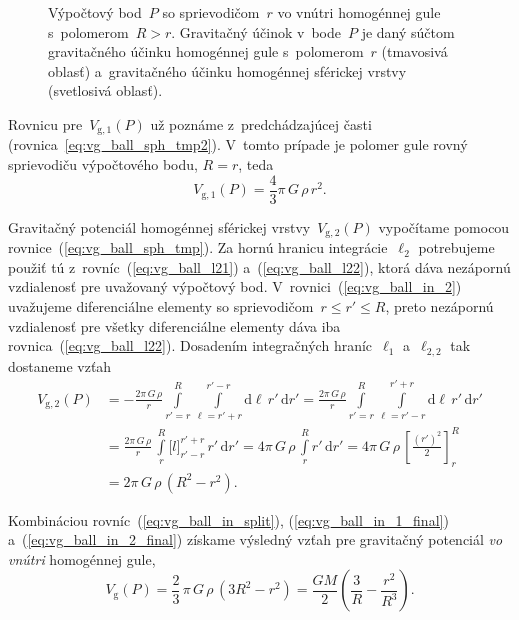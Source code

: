 \documentclass[a4paper, 12pt]{book}
\newcommand{\diff}{\mathrm d}
\newcommand{\gidx}{\mathrm g}
\begin{document}
\begin{figure}
\centering

\caption{Výpočtový bod~$P$ so sprievodičom~$r$ vo vnútri homogénnej gule 
s~polomerom~$R > r$.  Gravitačný účinok v~bode~$P$ je daný súčtom gravitačného 
účinku homogénnej gule s~polomerom~$r$ (tmavosivá oblasť) a~gravitačného účinku 
homogénnej sférickej vrstvy (svetlosivá oblasť).}
\label{fig:homogeneous_ball_in}
\end{figure}

Rovnicu pre~$V_{\gidx,1}(P)$ už poznáme z~predchádzajúcej časti 
(rovnica~\ref{eq:vg_ball_sph_tmp2}).  V~tomto prípade je polomer gule rovný 
sprievodiču výpočtového bodu, $R = r$, teda
%
\begin{equation}
\label{eq:vg_ball_in_1_final}
V_{\gidx,1}(P) = \frac{4}{3} \pi \, G \, \rho \, r^2{.}
\end{equation}

Gravitačný potenciál homogénnej sférickej vrstvy~$V_{\gidx,2}(P)$ vypočítame 
pomocou rovnice~(\ref{eq:vg_ball_sph_tmp}).  Za hornú hranicu 
integrácie~$\ell_2$ potrebujeme použiť tú z~rovníc~(\ref{eq:vg_ball_l21}) 
a~(\ref{eq:vg_ball_l22}), ktorá dáva nezápornú vzdialenosť pre uvažovaný 
výpočtový bod.  V~rovnici~(\ref{eq:vg_ball_in_2}) uvažujeme diferenciálne 
elementy so sprievodičom~$r \leq r' \leq R$, preto nezápornú vzdialenosť pre 
všetky diferenciálne elementy dáva iba rovnica~(\ref{eq:vg_ball_l22}).  
Dosadením integračných hraníc~$\ell_1$ a~$\ell_{2,2}$ tak dostaneme vzťah
%
\begin{equation}
\label{eq:vg_ball_in_2_final}
\begin{split}
V_{\gidx,2}(P) &= -\frac{2\pi \, G \, \rho}{r} \int\limits_{r' = r}^R 
\int\limits_{\ell = r' + r}^{r' - r} \diff \ell \, r' \, \diff r' = \frac{2\pi 
\, G \, \rho}{r} \int\limits_{r' = r}^R \int\limits_{\ell = r' - r}^{r' + r} 
\diff \ell \, r' \, \diff r'\\
%
&= \frac{2\pi \, G \, \rho}{r} \,  \int\limits_{r}^R \big[ l \big]_{r' - r}^{r' 
+ r} \, r'  \, \diff r' = 4\pi \, G \, \rho \,  \int\limits_{r}^R r'  \, \diff 
r' = 4\pi \, G \, \rho \,  \left[ \frac{(r')^2}{2} \right]_{r}^R\\
%
&= 2\pi \, G \, \rho \,  (R^2 - r^2){.}
\end{split}
\end{equation}

Kombináciou rovníc~(\ref{eq:vg_ball_in_split}), (\ref{eq:vg_ball_in_1_final}) 
a~(\ref{eq:vg_ball_in_2_final}) získame výsledný vzťah pre gravitačný potenciál 
\emph{vo vnútri} homogénnej gule,
%
\begin{equation}
\label{eq:vg_ball_in}
V_\gidx(P) = \frac{2}{3} \, \pi \, G \, \rho \, (3 R^2 - r^2) = \frac{GM}{2} 
\left( \frac{3}{R} - \frac{r^2}{R^3} \right){.}
\end{equation}
\end{document}
